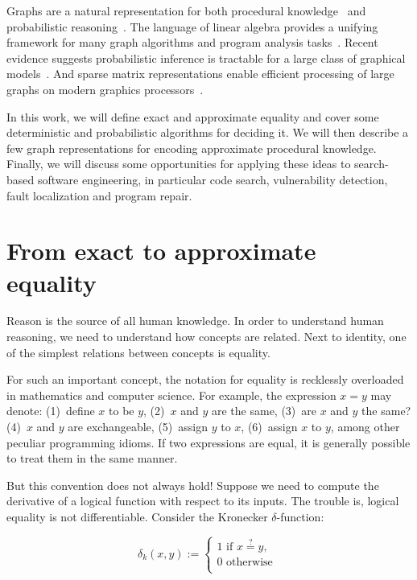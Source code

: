 \documentclass[11pt]{article}
\begin{document}
    Graphs are a natural representation for both procedural knowledge~\citep{allamanis2017learning} and probabilistic reasoning~\citep{pearl2014probabilistic}. The language of linear algebra provides a unifying framework for many graph algorithms and program analysis tasks~\citep{kepner2011graph}. Recent evidence suggests probabilistic inference is tractable for a large class of graphical models~\citep{choi2020probabilistic}. And sparse matrix representations enable efficient processing of large graphs on modern graphics processors~\citep{kepner2016mathematical}.

    In this work, we will define exact and approximate equality and cover some deterministic and probabilistic algorithms for deciding it. We will then describe a few graph representations for encoding approximate procedural knowledge. Finally, we will discuss some opportunities for applying these ideas to search-based software engineering, in particular code search, vulnerability detection, fault localization and program repair.


    \section{From exact to approximate equality}\label{sec:definitions}

    Reason is the source of all human knowledge. In order to understand human reasoning, we need to understand how concepts are related. Next to identity, one of the simplest relations between concepts is equality.

    For such an important concept, the notation for equality is recklessly overloaded in mathematics and computer science. For example, the expression $x = y$ may denote: (1)~define $x$ to be $y$, (2)~$x$ and $y$ are the same, (3)~are $x$ and $y$ the same? (4)~$x$ and $y$ are exchangeable, (5)~assign $y$ to $x$, (6)~assign $x$ to $y$, among other peculiar programming idioms. If two expressions are equal, it is generally possible to treat them in the same manner.

    But this convention does not always hold! Suppose we need to compute the derivative of a logical function with respect to its inputs. The trouble is, logical equality is not differentiable. Consider the Kronecker $\delta$-function: %

    $$
    \delta_k(x, y) :=
    \begin{cases}
        1 \text{ if } x \overset{?}{=} y, \\
        0 \text{ otherwise }\\
    \end{cases}
    $$
\end{document}
